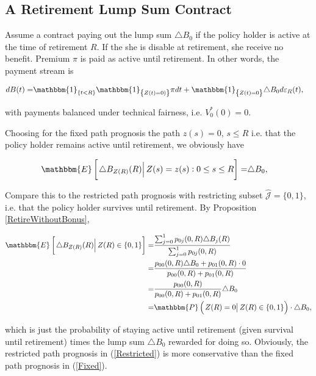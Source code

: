 \documentclass{book}
\newcommand{\1}[1]{\mathbbm{1}_{\left\lbrace #1 \right\rbrace}}
\newcommand{\econd}[2][def]{\mathbbm{E} \left[ \left. #1 \right| #2 \right]}
\newcommand{\pcond}[2][def]{\mathbbm{P} \left( \left. #1 \right| #2 \right)}
\theoremstyle{break}
\theoremstyle{remark}
\numberwithin{equation}{section}
\begin{document}
\subsection{A Retirement Lump Sum Contract}

Assume a contract paying out the lump sum $\triangle B_0$ if the policy holder is active at the time of retirement $R$. If the she is disable at retirement, she receive no benefit. Premium $\pi$ is paid as active until retirement. In other words, the payment stream is

\begin{align*}
	dB(t) =& \1{t<R} \1{Z(t)=0)} \pi dt + \1{Z(t)=0} \triangle B_0 d \varepsilon_R(t),
\end{align*}

with payments balanced under technical fairness, i.e. $V_0^*(0)=0$.

Choosing for the fixed path prognosis the path $z(s) = 0$, $s \leq R$ i.e. that the policy holder remains active until retirement, we obviously have

\begin{align} \label{Fixed}
	\econd[\triangle B_{Z(R)}(R)]{Z(s) = z(s) : 0 \leq s \leq R} =& \triangle B_0,
\end{align}

Compare this to the restricted path prognosis with restricting subset $\hat{\mathcal{J}} = \{ 0,1 \}$, i.e. that the policy holder survives until retirement. By Proposition \ref{RetireWithoutBonus},

\begin{align} \label{Restricted}
\begin{split}
		\econd[\triangle B_{Z(R)} (R)]{Z(R) \in \{ 0,1 \}} =& \frac{\sum_{j = 0}^1 p_{0j}(0,R) \triangle B_j(R)}{\sum_{j = 0}^1 p_{0j}(0,R)} \\
	=&\frac{p_{00}(0,R) \triangle B_0 + p_{01}(0,R) \cdot 0}{p_{00}(0,R) + p_{01}(0,R)} \\
	=& \frac{p_{00}(0,R)}{p_{00}(0,R) + p_{01}(0,R)} \triangle B_0 \\
	=& \pcond[Z(R) = 0]{Z(R) \in \{ 0,1 \}} \cdot \triangle B_0,
\end{split}
\end{align}

which is just the probability of staying active until retirement (given survival until retirement) times the lump sum $\triangle B_0$ rewarded for doing so. Obviously, the restricted path prognosis in (\ref{Restricted}) is more conservative than the fixed path prognosis in (\ref{Fixed}).
\end{document}
